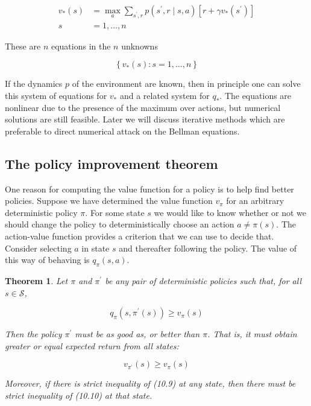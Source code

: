 \documentclass[11pt]{article}
\theoremstyle{plain} %
\newtheorem{theorem}{Theorem}[section]
\theoremstyle{remark}
\begin{document}
$$
  \begin{aligned}
    v_{*}(s) & =\max _{a} \sum_{s^{\prime}, r} p\left(s^{\prime}, r \mid s, a\right)\left[r+\gamma v_{*}\left(s^{\prime}\right)\right] \\
    s        & =1, \ldots, n
  \end{aligned}
$$

These are $n$ equations in the $n$ unknowns

$$
  \left\{v_{*}(s): s=1, \ldots, n\right\}
$$

If the dynamics $p$ of the environment are known, then in principle one
can solve this system of equations for $v_{*}$ and a related system for
$q_{*}$. The equations are nonlinear due to the presence of the maximum over
actions, but numerical solutions are still feasible. Later we will discuss iterative methods which are preferable to direct
numerical attack on the Bellman equations.


\subsection{The policy improvement theorem}
One reason for computing the value function for a policy is to help find better policies. Suppose we have determined the value function $v_{\pi}$ for an
arbitrary deterministic policy $\pi$. For some state $s$ we would like to know whether or not we should
change the policy to deterministically choose an action $a \neq \pi(s)$. The action-value function provides a criterion that we can use to
decide that. Consider selecting $a$ in state $s$ and thereafter following
the policy. The value of this way of behaving is $q_{\pi}(s, a)$.

\begin{theorem}
  Let $\pi$ and $\pi^{\prime}$ be any pair of deterministic policies such that,
  for all $s \in \mathcal{S}$,

  $$
    q_{\pi}\left(s, \pi^{\prime}(s)\right) \geq v_{\pi}(s)
  $$

  Then the policy $\pi^{\prime}$ must be as good as, or better than $\pi$. That
  is, it must obtain greater or equal expected return from all states:

  $$
    v_{\pi^{\prime}}(s) \geq v_{\pi}(s)
  $$

  Moreover, if there is strict inequality of (10.9) at any state, then there
  must be strict inequality of (10.10) at that state.
\end{theorem}
\end{document}
